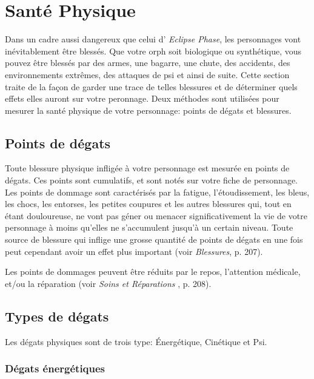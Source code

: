 \section{Santé Physique} \label{sec:physical-health} 

Dans un cadre aussi dangereux que celui d' \emph{Eclipse Phase}, les personnages vont inévitablement être blessés. Que votre orph soit biologique ou synthétique, vous pouvez être blessés par des armes, une bagarre, une chute, des accidents, des environnements extrêmes, des attaques de psi et ainsi de suite. Cette section traite de la façon de garder une trace de telles blessures et de déterminer quels effets elles auront sur votre peronnage. Deux méthodes sont utilisées pour mesurer la santé physique de votre personnage: points de dégats et blessures. 

\subsection{Points de dégats} \label{sec:damage-points} 

Toute blessure physique infligée à votre personnage est mesurée en points de dégats. Ces points sont cumulatifs, et sont notés sur votre fiche de personnage. Les points de dommage sont caractérisés par la fatigue, l'étoudissement, les bleus, les chocs, les entorses, les petites coupures et les autres blessures qui, tout en étant douloureuse, ne vont pas géner ou menacer significativement la vie de votre personnage à moins qu'elles ne s'accumulent jusqu'à un certain niveau. Toute source de blessure qui inflige une grosse quantité de points de dégats en une fois peut cependant avoir un effet plus important (voir \emph{Blessures}, p. 207). 

Les points de dommages peuvent être réduits par le repos, l'attention médicale, et/ou la réparation (voir \emph{Soins et Réparations }, p. 208). 



\subsection{Types de dégats} \label{sec:damage-types} 

Les dégats physiques sont de trois type: Énergétique, Cinétique et Psi. 

\subsubsection{Dégats énergétiques} 

